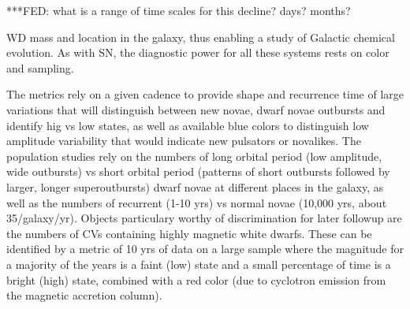***FED: what is a range of time scales for this decline? days? months?

WD mass and location in
the galaxy, thus enabling a study of Galactic chemical evolution.  As with SN, 
the diagnostic power for all these systems rests on color and sampling.   

The metrics rely on a given cadence to provide shape and recurrence time
of large variations that will distinguish between new novae, dwarf novae
outbursts and identify hig vs low states, as well as available blue colors to 
distinguish low amplitude variability that would indicate new pulsators or 
novalikes. The population studies rely on the numbers of long orbital period 
(low amplitude, wide outbursts) vs short orbital period (patterns of short 
outbursts followed by larger, longer superoutbursts) dwarf novae at different 
places in the galaxy, as well as the numbers of recurrent (1-10 yrs) vs normal 
novae (10,000 yrs, about 35/galaxy/yr). Objects particulary worthy of 
discrimination for later followup are the numbers of CVs containing highly 
magnetic white dwarfs. These can be identified by a metric of 10 yrs of data on
a large sample where the magnitude for a majority of the years is a faint (low)
state and a small percentage of time is a bright (high) state, combined with a 
red color (due to cyclotron emission from the magnetic accretion column).

